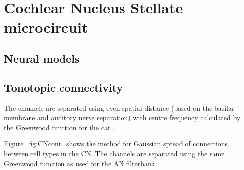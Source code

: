 

\section{Cochlear Nucleus Stellate microcircuit}

\subsection{Neural models}




\subsection{Tonotopic connectivity}\label{sec:tonot-conn}

The channels are separated using even spatial distance (based on the
basilar membrane and auditory nerve separation) with centre frequency
calculated by the Greenwood function for the cat
\citep{Greenwood:1990}. 


Figure~\ref{fig:CNconn} shows the method for Gaussian spread of
connections between cell types in the CN\@.  The channels are separated
using the same Greenwood function as used for the AN filterbank.


